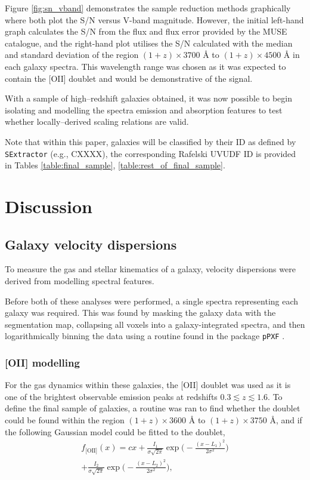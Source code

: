 \documentclass[12pt, twocolumn, nofootinbib]{revtex4-1}    %
\begin{document}
Figure \ref{fig:sn_vband} demonstrates the sample reduction methods graphically where both plot the S/N versus V-band magnitude. However, the initial left-hand graph calculates the S/N from the flux and flux error provided by the MUSE catalogue, and the right-hand plot utilises the S/N calculated with the median and standard deviation of the region $(1+z)\times3700$ {\AA} to $(1+z)\times4500$ {\AA} in each galaxy spectra. This wavelength range was chosen as it was expected to contain the [OII] doublet and would be demonstrative of the signal. 

With a sample of high--redshift galaxies obtained, it was now possible to begin isolating and modelling the spectra emission and absorption features to test whether locally--derived scaling relations are valid. 

Note that within this paper, galaxies will be classified by their ID as defined by \texttt{SExtractor} (e.g., CXXXX), the corresponding Rafelski UVUDF ID is provided in Tables \ref{table:final_sample}, \ref{table:rest_of_final_sample}.

\vspace{2ex} %
\section{Discussion} \label{sec:discussion}
\subsection{Galaxy velocity dispersions} \label{sec:disc_vel_disp}
\noindent
To measure the gas and stellar kinematics of a galaxy, velocity dispersions were derived from modelling spectral features. 

Before both of these analyses were performed, a single spectra representing each galaxy was required. This was found by masking the galaxy data with the segmentation map, collapsing all voxels into a galaxy-integrated spectra, and then logarithmically binning the data using a routine found in the package \texttt{pPXF} \citep{2017MNRAS.466..798C}.

\vspace{2ex} %
\subsubsection{[OII] modelling} \label{sec:disc_oii_modelling}
\noindent
For the gas dynamics within these galaxies, the [OII] doublet was used as it is one of the brightest observable emission peaks at redshifts $0.3\lesssim z\lesssim 1.6$. To define the final sample of galaxies, a routine was ran to find whether the doublet could be found within the region $(1+z)\times3600$ {\AA} to $(1+z)\times3750$ {\AA}, and if the following Gaussian model could be fitted to the doublet,
\begin{multline}
f_{\text{[OII]}}(x) = cx + \frac{I_1}{\sigma \sqrt{2\pi}} \exp{\Bigg(-\frac{(x-L_1)^2}{2\sigma^2}\Bigg)} \\
+ \frac{I_2}{\sigma \sqrt{2\pi}} \exp{\Bigg(-\frac{(x-L_2)^2}{2\sigma^2}\Bigg)},
\label{eqn:doublet}
\end{multline} 
\end{document}
